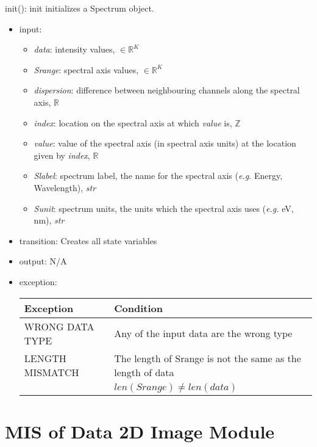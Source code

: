 \documentclass[12pt, titlepage]{article}
\begin{document}
\noindent init():
init initializes a Spectrum object.
\begin{itemize}
    \item input:
    \begin{itemize}
        \item \textit{data}: intensity values, $\in \mathbb{R}^K$
        \item \textit{Srange}: spectral axis values, $\in \mathbb{R}^K$
        \item \textit{dispersion}: difference  between neighbouring channels
        along the spectral axis,  $\mathbb{R}$
        \item \textit{index}: location on the spectral axis at which
        \textit{value} is, $\mathbb{Z}$
        \item \textit{value}: value of the spectral axis (in spectral axis
        units) at the location given by \textit{index}, $\mathbb{R}$
        \item \textit{Slabel}: spectrum label, the name for the spectral axis
        (\textit{e.g.} Energy, Wavelength), \textit{str}
        \item \textit{Sunit}: spectrum units, the units which the spectral axis
        uses (\textit{e.g.} \si{\electronvolt}, \si{\nano\metre}), \textit{str}
    \end{itemize}
    \item transition: Creates all state variables
    \item output: N/A
    \item exception:
    \begin{center}
        \begin{tabular}{p{3cm} p{12cm}}
            \toprule[0.15em]
            \textbf{Exception} & \textbf{Condition}\\
            \midrule[0.1em]
            WRONG DATA TYPE & Any of the input data are the wrong type\\ 
            \midrule[0.05em]
            LENGTH MISMATCH & The length of Srange is not the same as the length of
            data\\
            & $len(Srange) \neq len(data)$\\
            \bottomrule[0.15em]
        \end{tabular}
    \end{center}
\end{itemize}

\section{MIS of Data 2D Image Module} \label{Mod:Image}
\end{document}
